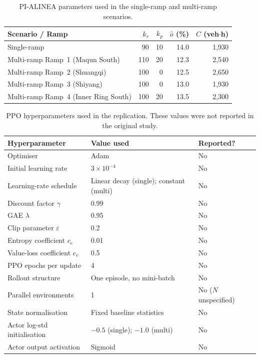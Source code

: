 \documentclass{rescience}
\begin{document}
\begin{table}[!h]
\centering
\caption{PI-ALINEA parameters used in the single-ramp and multi-ramp scenarios.}
\label{tab:alinea_params}
\begin{tabular}{lrrrr}
\toprule
\textbf{Scenario / Ramp} & $k_r$ & $k_p$ & $\hat{o}$ (\%) & $C$ (veh$\cdot$h) \\
\midrule
Single-ramp                          &  90 & 10 & 14.0 & 1{,}930 \\
Multi-ramp Ramp~1 (Maqun South)      & 110 & 20 & 12.3 & 2{,}540 \\
Multi-ramp Ramp~2 (Shuangqi)         & 100 &  0 & 12.5 & 2{,}650 \\
Multi-ramp Ramp~3 (Shiyang)          & 100 &  0 & 13.0 & 1{,}930 \\
Multi-ramp Ramp~4 (Inner Ring South) & 100 & 20 & 13.5 & 2{,}300 \\
\bottomrule
\end{tabular}
\end{table}

\begin{table}[!h]
\centering
\caption{PPO hyperparameters used in the replication. These values were not reported in the original study.}
\label{tab:ppo_params}
\begin{tabular}{lll}
\toprule
\textbf{Hyperparameter} & \textbf{Value used} & \textbf{Reported?} \\
\midrule
Optimiser & Adam & No \\
Initial learning rate & $3 \times 10^{-4}$ & No \\
Learning-rate schedule & Linear decay (single); constant (multi) & No \\
Discount factor $\gamma$ & 0.99 & No \\
GAE $\lambda$ & 0.95 & No \\
Clip parameter $\varepsilon$ & 0.2 & No \\
Entropy coefficient $c_e$ & 0.01 & No \\
Value-loss coefficient $c_v$ & 0.5 & No \\
PPO epochs per update & 4 & No \\
Rollout structure & One episode, no mini-batch & No \\
Parallel environments & 1 & No ($N$ unspecified) \\
State normalisation & Fixed baseline statistics & No \\
Actor log-std initialisation & $-0.5$ (single); $-1.0$ (multi) & No \\
Actor output activation & Sigmoid & No \\
\bottomrule
\end{tabular}
\end{table}
\end{document}
